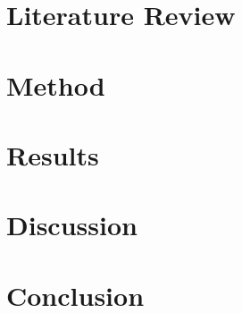 \section{Literature Review}


\section{Method}


\section{Results}


\section{Discussion}


\section{Conclusion}







\newpage



